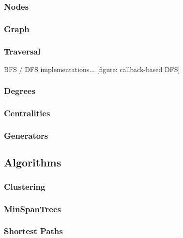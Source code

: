 		\subsubsection{Nodes}
		\label{sssection: core_nodes}
		
		\subsubsection{Graph}
		\label{sssection: core_graph}
		
		\subsubsection{Traversal}
		\label{sssection: core_traveral}
		
		BFS / DFS implementations... [figure: callback-based DFS]
		
		\subsubsection{Degrees}
		\label{sssection: core_degrees}
		
		\subsubsection{Centralities}
		\label{sssection: core_centralities}
		
		\subsubsection{Generators}
		\label{sssection: core_}
		
	
	\subsection{Algorithms}
	\label{ssect:algorithms}
	
		\subsubsection{Clustering}
		\label{sssection: algo_clustering}
		
		\subsubsection{MinSpanTrees}
		\label{sssection: algo_minspan}
		
		\subsubsection{Shortest Paths}
		\label{sssection: algo_shorest_paths}


